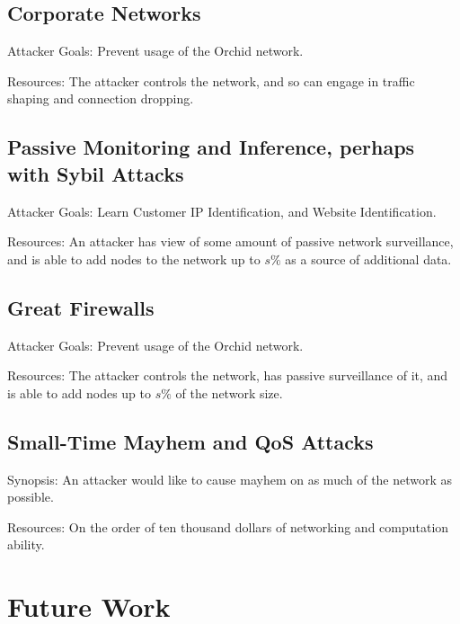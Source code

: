 \documentclass{article}
\newcommand{\mesh}{Orchid}
\newcommand{\Mesh}{\mesh}
\begin{document}
\subsection{Corporate Networks}

Attacker Goals: Prevent usage of the \Mesh{} network.

Resources: The attacker controls the network, and so can engage in traffic shaping and connection dropping.

\subsection{Passive Monitoring and Inference, perhaps with Sybil Attacks}

Attacker Goals: Learn Customer IP Identification, and Website Identification.

Resources: An attacker has view of some amount of passive network surveillance, and is able to add nodes to the network up to $s\%$ as a source of additional data.

\subsection{Great Firewalls}

Attacker Goals: Prevent usage of the \Mesh{} network.

Resources: The attacker controls the network, has passive surveillance of it, and is able to add nodes up to $s\%$ of the network size.

\subsection{Small-Time Mayhem and QoS Attacks}

Synopsis: An attacker would like to cause mayhem on as much of the network as possible.

Resources: On the order of ten thousand dollars of networking and computation ability.



\section{Future Work}
\label{sec:future}
\end{document}
